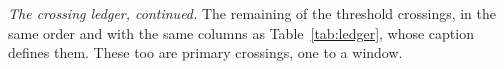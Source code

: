 \begin{table}
\centering
\caption{\emph{The crossing ledger, continued.} The remaining
\CxLedgerPartTwo{} of the \EvNCrossRaw{} threshold crossings, in the same
order and with the same columns as Table~\ref{tab:ledger}, whose caption
defines them. These too are primary crossings, one to a window.}
\label{tab:ledgercont}
\scriptsize

\end{table}
